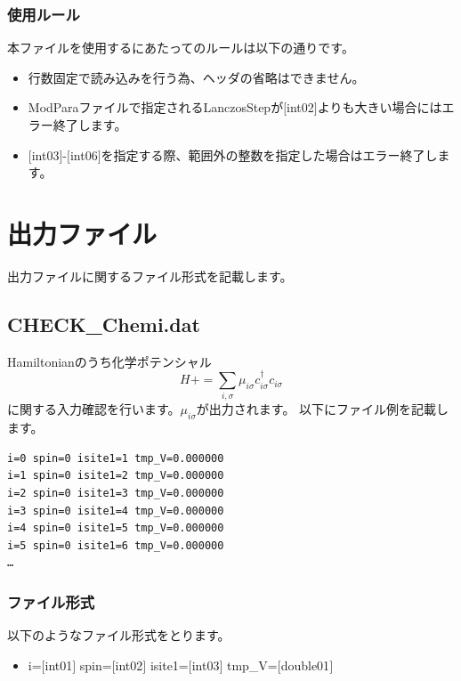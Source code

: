 \subsubsection{使用ルール}
本ファイルを使用するにあたってのルールは以下の通りです。
\begin{itemize}
\item 行数固定で読み込みを行う為、ヘッダの省略はできません。
\item ModParaファイルで指定されるLanczosStepが$[$int02$]$よりも大きい場合にはエラー終了します。
\item $[$int03$]$-$[$int06$]$を指定する際、範囲外の整数を指定した場合はエラー終了します。
\end{itemize}


\newpage
\section{出力ファイル}
\label{Sec:outputfile}
出力ファイルに関するファイル形式を記載します。
\subsection{CHECK\_Chemi.dat}
\label{Subsec:checkchemi}
Hamiltonianのうち化学ポテンシャル
\begin{equation}
H+=\sum_{i,\sigma} \mu_{i\sigma} c_{i\sigma}^{\dagger}c_{i\sigma}
\end{equation}
に関する入力確認を行います。$\mu_{i\sigma}$が出力されます。
以下にファイル例を記載します。

\begin{minipage}{12.5cm}
\begin{screen}
\begin{verbatim}
i=0 spin=0 isite1=1 tmp_V=0.000000 
i=1 spin=0 isite1=2 tmp_V=0.000000 
i=2 spin=0 isite1=3 tmp_V=0.000000 
i=3 spin=0 isite1=4 tmp_V=0.000000 
i=4 spin=0 isite1=5 tmp_V=0.000000 
i=5 spin=0 isite1=6 tmp_V=0.000000 
…
\end{verbatim}
\end{screen}
\end{minipage}

\subsubsection{ファイル形式}
以下のようなファイル形式をとります。
 \begin{itemize}
   \item  i=$[$int01$]$ spin=$[$int02$]$ isite1=$[$int03$]$ tmp\_V=$[$double01$]$ 
 \end{itemize}
  
